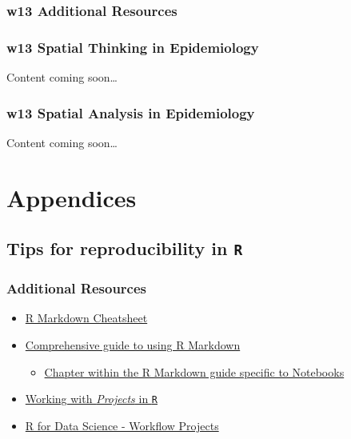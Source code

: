 \documentclass[
]{book}
\newcommand{\passthrough}[1]{#1}
\providecommand{\tightlist}{%
  \setlength{\itemsep}{0pt}\setlength{\parskip}{0pt}}
\begin{document}
\hypertarget{w13-additional-resources}{%
\section{w13 Additional Resources}\label{w13-additional-resources}}

\hypertarget{w13-spatial-thinking-in-epidemiology}{%
\section{w13 Spatial Thinking in Epidemiology}\label{w13-spatial-thinking-in-epidemiology}}

Content coming soon\ldots{}

\hypertarget{w13-spatial-analysis-in-epidemiology}{%
\section{w13 Spatial Analysis in Epidemiology}\label{w13-spatial-analysis-in-epidemiology}}

Content coming soon\ldots{}

\hypertarget{part-appendices}{%
\part{Appendices}\label{part-appendices}}

\hypertarget{tips-for-reproducibility-in-r}{%
\chapter{\texorpdfstring{Tips for reproducibility in \texttt{R}}{Tips for reproducibility in R}}\label{tips-for-reproducibility-in-r}}

\hypertarget{additional-resources}{%
\section*{Additional Resources}\label{additional-resources}}

\begin{itemize}
\tightlist
\item
  \href{https://rstudio.com/wp-content/uploads/2015/02/rmarkdown-cheatsheet.pdf}{R Markdown Cheatsheet}
\item
  \href{https://bookdown.org/yihui/rmarkdown/}{Comprehensive guide to using R Markdown}

  \begin{itemize}
  \tightlist
  \item
    \href{https://bookdown.org/yihui/rmarkdown/notebook.html}{Chapter within the R Markdown guide specific to Notebooks}
  \end{itemize}
\item
  \href{https://support.rstudio.com/hc/en-us/articles/200526207-Using-Projects}{Working with \emph{Projects} in \passthrough{\lstinline!R!}}
\item
  \href{https://r4ds.had.co.nz/workflow-projects.html}{R for Data Science - Workflow Projects}
\end{itemize}
\end{document}
